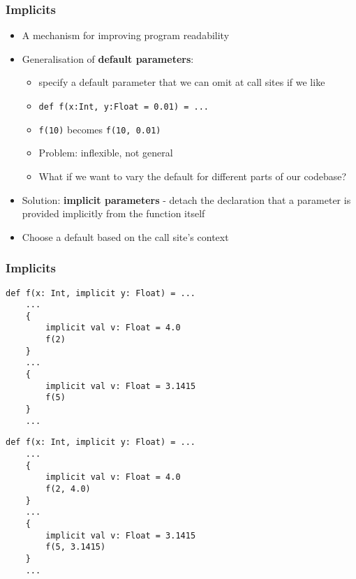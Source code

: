 \begin{frame}
    \frametitle{Implicits}
    \begin{itemize}
        \item A mechanism for improving program readability
        \pause
        \item Generalisation of \textbf{default parameters}:
        \begin{itemize}
            \pause
            \item specify a default parameter that we can omit at call sites if
                we like
            \pause
            \item \texttt{def f(x:Int, y:Float = 0.01) = ...}
            \pause
            \item \texttt{f(10)} becomes \texttt{f(10, 0.01)}
            \pause
            \item Problem: inflexible, not general
            \pause
            \item What if we want to vary the default for different parts of our
                codebase?
        \end{itemize}
        \pause
        \item Solution: \textbf{implicit parameters} - detach the declaration
            that a parameter is provided implicitly from the function itself
        \item Choose a default based on the call site's context
    \end{itemize}
\end{frame}

\begin{frame}[fragile]
    \frametitle{Implicits}
    \pause
    \begin{overprint}
        \begin{lstlisting}[mathescape]
    def f(x: Int, implicit y: Float) = ...
    ...
    {
        implicit val v: Float = 4.0
        f(2)
    }
    ...
    {
        implicit val v: Float = 3.1415
        f(5)
    }
    ...
        \end{lstlisting}
        \begin{lstlisting}[mathescape]
    def f(x: Int, implicit y: Float) = ...
    ...
    {
        implicit val v: Float = 4.0
        f(2, 4.0)
    }
    ...
    {
        implicit val v: Float = 3.1415
        f(5, 3.1415)
    }
    ...
        \end{lstlisting}
    \end{overprint}
\end{frame}

